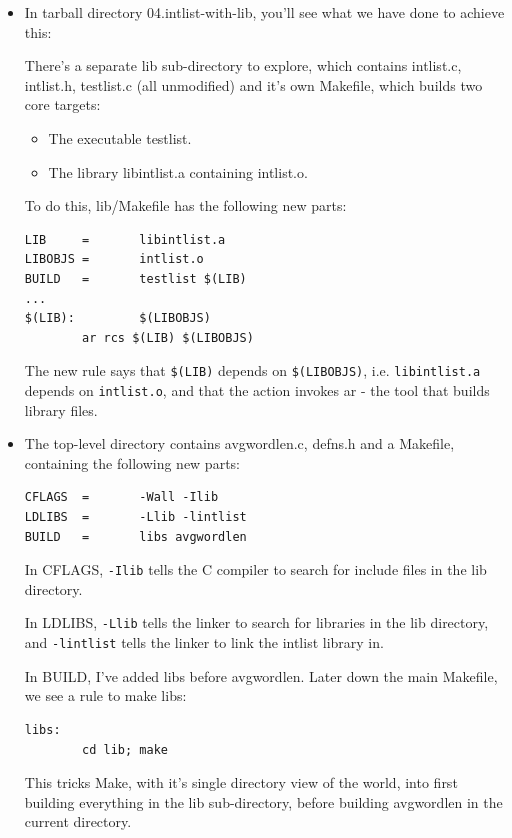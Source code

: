 \documentclass[handout]{beamer}
\begin{document}
\begin{frame}[fragile]
\begin{itemize}
  \item
  In tarball directory \alert{04.intlist-with-lib}, you'll see
  what we have done to achieve this:

  \pitem
  There's a separate \alert{lib} sub-directory to explore, which contains \alert{intlist.c, intlist.h, testlist.c} (all unmodified) and it's own Makefile,
  which builds two core targets:
  \begin{itemize}
    \item
    The executable \alert{testlist}.
    \item
    The library \alert{libintlist.a} containing \alert{intlist.o}.
  \end{itemize}
  \pitem
  To do this, \alert{lib/Makefile} has the following new parts:
\begin{verbatim}
LIB     =       libintlist.a
LIBOBJS =       intlist.o
BUILD   =       testlist $(LIB)
...
$(LIB):         $(LIBOBJS)
        ar rcs $(LIB) $(LIBOBJS)
\end{verbatim}


\pitem
The new rule says that \verb+$(LIB)+ depends on \verb+$(LIBOBJS)+,
i.e. \verb+libintlist.a+ depends on \verb+intlist.o+, and that the action invokes 
\alert{ar} - the tool that builds library files.

\end{itemize}
\end{frame}

\begin{frame}[fragile]
\begin{itemize}
\item
The top-level directory contains \alert{avgwordlen.c}, \alert{defns.h} and a Makefile,
\pause
containing the following new parts:
\begin{verbatim}
CFLAGS  =       -Wall -Ilib
LDLIBS  =       -Llib -lintlist
BUILD   =       libs avgwordlen
\end{verbatim}

\pitem
In CFLAGS, \verb+-Ilib+ tells the C compiler to search for include files in
the lib directory.

\pitem
In LDLIBS, \verb+-Llib+ tells the linker to search for libraries in the lib directory, and \verb+-lintlist+ tells the linker
to link the intlist library in.

\pitem
In BUILD, I've added \alert{libs} before \alert{avgwordlen}.
Later down the main Makefile, we see a rule to make \alert{libs}:
\begin{verbatim}
libs:
        cd lib; make
\end{verbatim}

\pitem
This tricks Make, with it's \alert{single directory} view of the world,
into first building everything in the lib sub-directory,
before building \alert{avgwordlen} in the current directory.

\end{itemize}
\end{frame}
\end{document}
